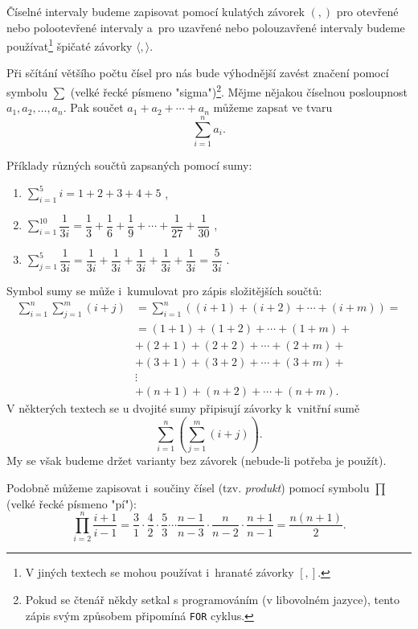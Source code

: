 Číselné intervaly budeme zapisovat pomocí kulatých závorek $(,)$ pro otevřené nebo polootevřené intervaly a~pro uzavřené nebo polouzavřené intervaly budeme používat\footnote{V jiných textech se mohou používat i~hranaté závorky $[,]$.} špičaté závorky $\langle,\rangle$.\par
\medskip
Při sčítání většího počtu čísel pro nás bude výhodnější zavést značení pomocí symbolu $\sum$ (velké řecké písmeno "sigma")\footnote{Pokud se čtenář někdy setkal s programováním (v libovolném jazyce), tento zápis svým způsobem připomíná \texttt{FOR} cyklus.}. Mějme nějakou číselnou posloupnost $a_1,a_2,\dots,a_n$. Pak součet $a_1+a_2+\cdots+a_n$ můžeme zapsat ve tvaru
\begin{equation*}
    \sum_{i=1}^{n}{a_i}.
\end{equation*}
\begin{example}\label{ex:uziti_sum}
    Příklady různých součtů zapsaných pomocí sumy:
    \begin{enumerate}[label=(\roman*)]
        \item $\displaystyle \sum_{i=1}^{5}{i}=1+2+3+4+5$ ,
        \item $\displaystyle \sum_{i=1}^{10}{\dfrac{1}{3i}}=\dfrac{1}{3}+\dfrac{1}{6}+\dfrac{1}{9}+\cdots+\dfrac{1}{27}+\dfrac{1}{30}$ ,
        \item $\displaystyle \sum_{j=1}^{5}{\dfrac{1}{3i}}=\dfrac{1}{3i}+\dfrac{1}{3i}+\dfrac{1}{3i}+\dfrac{1}{3i}+\dfrac{1}{3i}=\dfrac{5}{3i}$ .
    \end{enumerate}
\end{example}
Symbol sumy se může i~kumulovat pro zápis složitějších součtů:
\begin{align*}
    \sum_{i=1}^{n}{\sum_{j=1}^{m}{(i+j)}}&=\sum_{i=1}^{n}{\left((i+1)+(i+2)+\cdots+(i+m)\right)}=\\
    &=(1+1)+(1+2)+\cdots+(1+m)+\\
    &+(2+1)+(2+2)+\cdots+(2+m)+\\
    &+(3+1)+(3+2)+\cdots+(3+m)+\\
    &\vdots\\
    &+(n+1)+(n+2)+\cdots+(n+m).
\end{align*}
V některých textech se u dvojité sumy připisují závorky k~vnitřní sumě
\begin{equation*}
    \sum_{i=1}^{n}{\left(\sum_{j=1}^{m}{(i+j)}\right)}.
\end{equation*}
My se však budeme držet varianty bez závorek (nebude-li potřeba je použít).\par
Podobně můžeme zapisovat i~součiny čísel (tzv. \emph{produkt}) pomocí symbolu $\prod$ (velké řecké písmeno "pí"):
\begin{equation*}
    \prod_{i=2}^{n}{\dfrac{i+1}{i-1}}=\dfrac{3}{1}\cdot\dfrac{4}{2}\cdot\dfrac{5}{3}\cdots\dfrac{n-1}{n-3}\cdot\dfrac{n}{n-2}\cdot\dfrac{n+1}{n-1}=\dfrac{n(n+1)}{2}.
\end{equation*}


